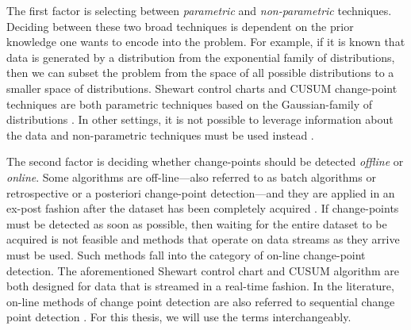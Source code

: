The first factor is selecting between \textit{parametric} and \textit{non-parametric} techniques. Deciding between these two broad techniques is dependent on the prior knowledge one wants to encode into the problem. For example, if it is known that data is generated by a distribution from the exponential family of distributions, then we can subset the problem from the space of all possible distributions to a smaller space of distributions. Shewart control charts and CUSUM change-point techniques are both parametric techniques based on the Gaussian-family of distributions \cite{page1954continuous} \cite{chen2011parametric}. In other settings, it is not possible to leverage information about the data and non-parametric techniques must be used instead \cite{brodsky2013nonparametric}.


The second factor is deciding whether change-points should be detected \textit{offline} or \textit{online}. Some algorithms are off-line---also referred to  as batch algorithms or retrospective or a posteriori change-point detection---and they are applied in an ex-post fashion after the dataset has been completely acquired \cite{truong2018review}. If change-points must be detected as soon as possible, then waiting for the entire dataset to be acquired is not feasible and methods that operate on data streams as they arrive must be used. Such methods fall into the category of on-line change-point detection. The aforementioned Shewart control chart and CUSUM algorithm are both designed for data that is streamed in a real-time fashion. In the literature, on-line methods of change point detection are also referred to sequential change point detection  \cite{tartakovsky2014sequential}. For this thesis, we will use the terms interchangeably.%


